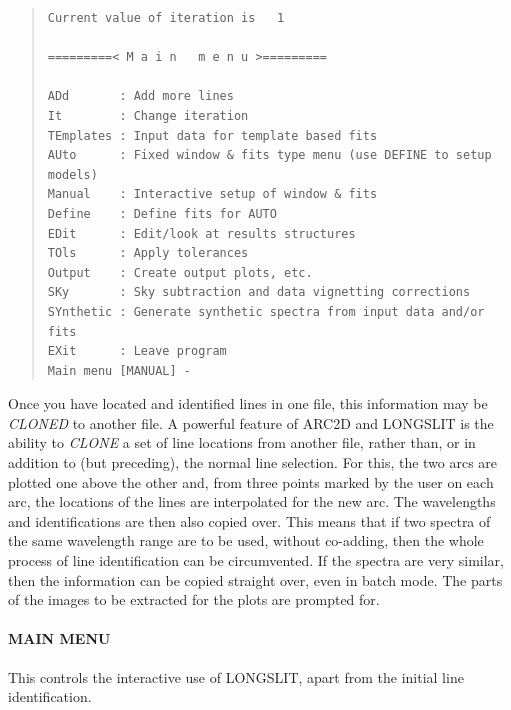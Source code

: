 \documentclass[11pt,twoside]{article}
\begin{document}
\begin{quote}\begin{verbatim}
Current value of iteration is   1

=========< M a i n   m e n u >=========

ADd       : Add more lines
It        : Change iteration
TEmplates : Input data for template based fits
AUto      : Fixed window & fits type menu (use DEFINE to setup models)
Manual    : Interactive setup of window & fits
Define    : Define fits for AUTO
EDit      : Edit/look at results structures
TOls      : Apply tolerances
Output    : Create output plots, etc.
SKy       : Sky subtraction and data vignetting corrections
SYnthetic : Generate synthetic spectra from input data and/or fits
EXit      : Leave program
Main menu [MANUAL] -
\end{verbatim}\end{quote}

Once you have located and identified lines in one file, this information
may be {\em CLONED} to another file.
A powerful feature of ARC2D and LONGSLIT
is the ability to {\em CLONE} a set of line locations from another
file, rather than, or in addition to (but preceding), the normal line
selection. For this, the two arcs are plotted one above the other
and, from three points marked by the user on each
arc, the locations of the lines are interpolated for the new arc. The
wavelengths and identifications are then also copied over. This means
that if two spectra of the same wavelength range are to be used,
without co-adding, then the whole process of line identification can be
circumvented. If the spectra are very similar, then the information can
be copied straight over, even in batch mode.
The parts of the images to be extracted for the plots are prompted for.

\paragraph{MAIN MENU}
\label{long.main}

This controls the interactive use of LONGSLIT, apart from the initial
line identification.
\end{document}
